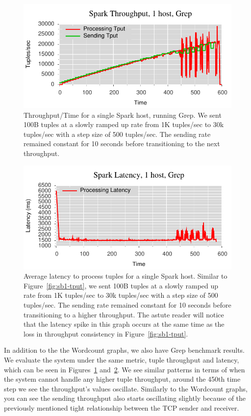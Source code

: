 \begin{figure}[t]
\centering
\includegraphics[width=1\linewidth]{figures/sp2_tput.pdf}
\caption{Throughput/Time for a single Spark host, running Grep. We sent 100B tuples at a
slowly ramped up rate from 1K tuples/sec to 30k tuples/sec with a step size of
500 tuples/sec. The sending rate remained constant for 10 seconds before
transitioning to the next throughput.}
\label{fig:sp2-tput}
\end{figure}

\begin{figure}[t]
\centering
\includegraphics[width=1\linewidth]{figures/sp2_latency.pdf}
\caption{Average latency to process tuples for a single Spark host. Similar to
Figure~\ref{fig:sb1-tput}, we sent 100B tuples at a slowly ramped up rate from 1K
tuples/sec to 30k tuples/sec with a step size of 500 tuples/sec. The sending
rate remained constant for 10 seconds before transitioning to a higher
throughput. The astute reader will notice that the latency spike in this graph
occurs at the same time as the loss in throughput consistency in
Figure~\ref{fig:sb1-tput}.}
\label{fig:sp2-latency}
\end{figure}

In addition to the the Wordcount graphs, we also have Grep benchmark
results.  We evaluate the system under the same metric, tuple throughput and
latency, which can be seen in Figures~\ref{fig:sp2-tput}
and~\ref{fig:sp2-latency}. We see similar patterns in terms of when the system
cannot handle any higher tuple throughput, around the 450th time step we see
the throughput's values oscillate. Similarly to the Wordcount graphs, you can
see the sending throughput also starts oscillating slightly because of the
previously mentioned tight relationship between the TCP sender and receiver.


